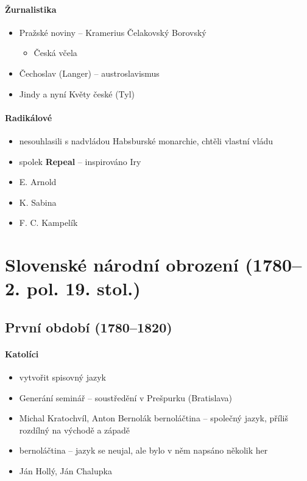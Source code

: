\paragraph{Žurnalistika}
\begin{itemize}
\item Pražské noviny -- Kramerius \ra Čelakovský \ra Borovský
	\begin{itemize}
	\item Česká včela
	\end{itemize}
\item Čechoslav (Langer) -- austroslavismus
\item Jindy a nyní \ra Květy české (Tyl)
\end{itemize}

\paragraph{Radikálové}
\begin{itemize}
\item nesouhlasili s nadvládou Habsburské monarchie, chtěli vlastní vládu
\item spolek \textbf{Repeal} -- inspirováno Iry
\item E. Arnold
\item K. Sabina
\item F. C. Kampelík
\end{itemize}

\section{Slovenské národní obrození (1780--2. pol. 19. stol.)}
\subsection{První období (1780--1820)}
\paragraph{Katolíci}
\begin{itemize}
\item vytvořit spisovný jazyk
\item Generání seminář -- soustředění v Prešpurku (Bratislava)
\item Michal Kratochvíl, Anton Bernolák \ra bernoláčtina -- společný jazyk, příliš rozdílný na východě a západě
\item bernoláčtina -- jazyk se neujal, ale bylo v něm napsáno několik her
\item Ján Hollý, Ján Chalupka
\end{itemize}

